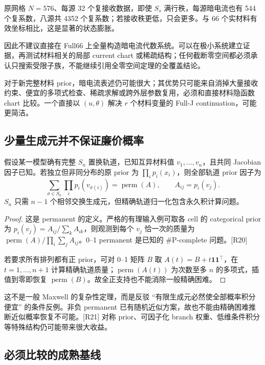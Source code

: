原网格 $N=576$、每源 32 个复接收数据，即使 $S_s$ 满行秩，每源暗电流也有 544 个复系数，八源共 4352 个复系数；若接收秩更低，只会更多。与 66 个实材料有效坐标相比，这是显著的状态膨胀。

因此不建议直接在 Full66 上全量构造暗电流代数系统。可以在极小系统建立证据，再测试材料相关的局部 current chart 或稀疏结构；任何截断零空间都必须承认只搜索受限子族，不能继续引用全零空间定理的全覆盖结论。

对于新完整材料 prior，暗电流表述仍可能很大；其优势只可能来自消掉大量接收约束、便宜的多项式检查、稀疏求解或跨外层参数复用，必须和直接材料隐函数 chart 比较。一个直接以 $(u,\theta)$ 解决 $r$ 个材料变量的 Full-J continuation，可能更简洁。

\subsection{少量生成元并不保证廉价概率}

\begin{proposition}[完全已知轨道的精确质量仍可困难]
假设某一模型确有完整 $S_n$ 置换轨道，已知互异材料值 $v_1,\ldots,v_n$，且共同 Jacobian 因子已知。若独立但非同分布的原 prior 为 $\prod_i p_i(x_i)$，则全部轨道 prior 因子为
\begin{equation}
\sum_{\sigma\in S_n}\prod_i p_i(v_{\sigma(i)})
=\operatorname{perm}(A),\qquad A_{ij}=p_i(v_j).
\end{equation}
$S_n$ 只需 $n-1$ 个相邻交换生成元，但精确轨道归一化包含永久积计算问题。
\end{proposition}
\begin{proof}
这是 permanent 的定义。严格的有理输入例可取各 cell 的 categorical prior 为 $p_i(v_j)=A_{ij}/\sum_kA_{ik}$，则观测到每个 $v_j$ 恰一次的质量为 $\operatorname{perm}(A)/\prod_i\sum_jA_{ij}$。0--1 permanent 是已知的 \#P-complete 问题。[R20]

若要求所有排列都有正 prior，可对 0--1 矩阵 $B$ 取 $A(t)=B+t\mathbf1\mathbf1^\top$，在 $t=1,\ldots,n+1$ 计算精确轨道质量；$\operatorname{perm}(A(t))$ 为次数至多 $n$ 的多项式，插值到零即恢复 $\operatorname{perm}(B)$。故全正支持也不能消除一般精确困难。
\end{proof}

这不是一般 Maxwell 的复杂性定理，而是反驳 ``有限生成元必然使全部概率积分便宜'' 的条件反例。非负 permanent 已有随机近似方案，故也不能由精确困难推断近似概率恢复不可能。[R21] 对称 prior、可因子化 branch 权重、低维条件积分等特殊结构仍可能带来很大收益。

\subsection{必须比较的成熟基线}

